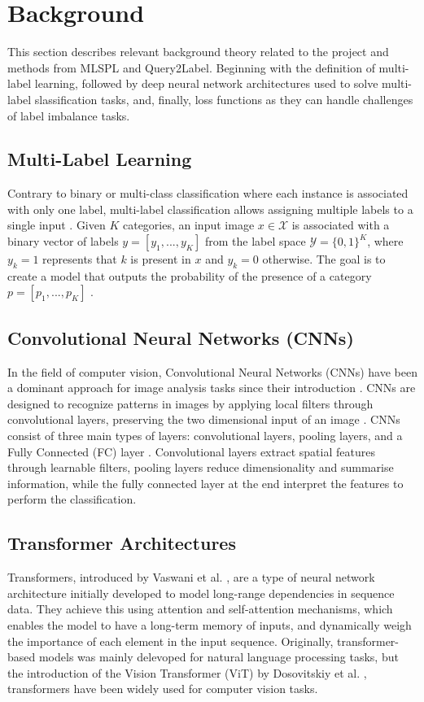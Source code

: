 \documentclass[lettersize,journal]{IEEEtran}
\begin{document}
\section{Background}
This section describes relevant background theory related to the project and methods from MLSPL and Query2Label. Beginning with the definition of multi-label learning, followed by deep neural network architectures used to solve multi-label slassification tasks, and, finally, loss functions as they can handle challenges of label imbalance tasks.

\subsection{Multi-Label Learning}
Contrary to binary or multi-class classification where each instance is associated with only one label, multi-label classification allows assigning multiple labels to a single input \cite{mlsp}. Given $K$ categories, an input image $x\in \mathcal{X}$ is associated with a binary vector of labels $y=[y_1,...,y_K]$ from the label space $\mathcal{Y}=\{0,1\}^K$, where $y_k=1$ represents that $k$ is present in $x$ and $y_k=0$ otherwise. The goal is to create a model that outputs the probability of the presence of a category $p=[p_1,...,p_K]$ \cite{mlsp,Query2Label}.

\subsection{Convolutional Neural Networks (CNNs)}
In the field of computer vision, Convolutional Neural Networks (CNNs) have been a dominant approach for image analysis tasks since their introduction \cite{lecun95}. CNNs are designed to recognize patterns in images by applying local filters through convolutional layers, preserving the two dimensional input of an image \cite{zhang2023dive}. CNNs consist of three main types of layers: convolutional layers, pooling layers, and a Fully Connected (FC) layer \cite{asawaCS231n}. Convolutional layers extract spatial features through learnable filters, pooling layers reduce dimensionality and summarise information, while the fully connected layer at the end interpret the features to perform the classification.

\subsection{Transformer Architectures}
Transformers, introduced by Vaswani et al. \cite{vaswani2023attentionneed}, are a type of neural network architecture initially developed to model long-range dependencies in sequence data. They achieve this using attention and self-attention mechanisms, which enables the model to have a long-term memory of inputs, and dynamically weigh the importance of each element in the input sequence. Originally, transformer-based models was mainly delevoped for natural language processing tasks, but the introduction of the Vision Transformer (ViT) by Dosovitskiy et al. \cite{dosovitskiy2021imageworth16x16words}, transformers have been widely used for computer vision tasks. 
\end{document}
